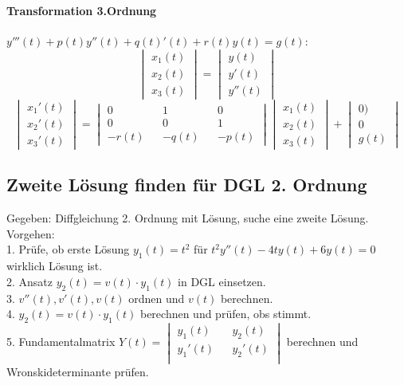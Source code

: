 \paragraph{Transformation 3.Ordnung} $y'''(t) + p(t)y''(t)+q(t)'(t)+r(t)y(t)=g(t)$:\\
\begin{equation*}
	\begin{vmatrix} 
	        x_1(t)\\ 
	        x_2(t)\\
	        x_3(t)   
	\end{vmatrix}
	=
	\begin{vmatrix} 
	        y(t)\\ 
	        y'(t)\\
	        y''(t)   
	\end{vmatrix}
\end{equation*}
\begin{equation*}
	\begin{vmatrix} 
	        x_1'(t)\\ 
	        x_2'(t)\\
	        x_3'(t)   
	\end{vmatrix}
	=
	\begin{vmatrix} 
	        0 && 1 && 0\\ 
	        0 && 0 && 1\\
	        -r(t) && -q(t) && -p(t)   
	\end{vmatrix}
		\begin{vmatrix} 
		        x_1(t)\\ 
		        x_2(t)\\
		        x_3(t)   
		\end{vmatrix}
		+
			\begin{vmatrix} 
			        0)\\ 
			        0\\
			        g(t)   
			\end{vmatrix}
\end{equation*}

\subsection{Zweite Lösung finden für DGL 2. Ordnung}
Gegeben: Diffgleichung 2. Ordnung mit Lösung, suche eine zweite Lösung.\\
Vorgehen:\\
1. Prüfe, ob erste Lösung $y_1(t)=t^2$ für $t^2y''(t) -4ty(t) +6y(t) = 0$ wirklich Lösung ist. \\
2. Ansatz $y_2(t)=v(t)\cdot y_1(t)$ in DGL einsetzen. \\
3. $v''(t),v'(t),v(t)$ ordnen und $v(t)$ berechnen. \\
4. $y_2(t)=v(t)\cdot y_1(t)$ berechnen und prüfen, obs stimmt.\\
5. Fundamentalmatrix $Y(t) = 	\begin{vmatrix} 
	        						y_1(t) && y_2(t)\\ 
	        						y_1'(t) && y_2'(t)\\ 
								\end{vmatrix}$
berechnen und Wronskideterminante prüfen. 


